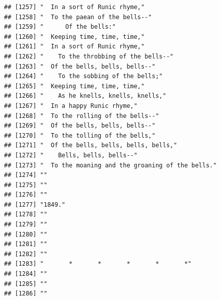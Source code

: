 \documentclass{article}\usepackage[]{graphicx}\usepackage[]{color}
\makeatletter
\newenvironment{kframe}{%
 \def\at@end@of@kframe{}%
 \ifinner\ifhmode%
  \def\at@end@of@kframe{\end{minipage}}%
  \begin{minipage}{\columnwidth}%
 \fi\fi%
 \def\FrameCommand##1{\hskip\@totalleftmargin \hskip-\fboxsep
 \colorbox{shadecolor}{##1}\hskip-\fboxsep
     \hskip-\linewidth \hskip-\@totalleftmargin \hskip\columnwidth}%
 \MakeFramed {\advance\hsize-\width
   \@totalleftmargin\z@ \linewidth\hsize
   \@setminipage}}%
 {\par\unskip\endMakeFramed%
 \at@end@of@kframe}
\newenvironment{knitrout}{}{} %
\makeatother
\begin{document}
\begin{knitrout}
\begin{kframe}
\begin{verbatim}
## [1257] "  In a sort of Runic rhyme,"                                                 
## [1258] "  To the paean of the bells--"                                               
## [1259] "      Of the bells:"                                                         
## [1260] "  Keeping time, time, time,"                                                 
## [1261] "  In a sort of Runic rhyme,"                                                 
## [1262] "    To the throbbing of the bells--"                                         
## [1263] "  Of the bells, bells, bells--"                                              
## [1264] "    To the sobbing of the bells;"                                            
## [1265] "  Keeping time, time, time,"                                                 
## [1266] "    As he knells, knells, knells,"                                           
## [1267] "  In a happy Runic rhyme,"                                                   
## [1268] "  To the rolling of the bells--"                                             
## [1269] "  Of the bells, bells, bells--"                                              
## [1270] "  To the tolling of the bells,"                                              
## [1271] "  Of the bells, bells, bells, bells,"                                        
## [1272] "    Bells, bells, bells--"                                                   
## [1273] "  To the moaning and the groaning of the bells."                             
## [1274] ""                                                                            
## [1275] ""                                                                            
## [1276] ""                                                                            
## [1277] "1849."                                                                       
## [1278] ""                                                                            
## [1279] ""                                                                            
## [1280] ""                                                                            
## [1281] ""                                                                            
## [1282] ""                                                                            
## [1283] "       *       *       *       *       *"                                    
## [1284] ""                                                                            
## [1285] ""                                                                            
## [1286] ""                                                                            

\end{verbatim}
\end{kframe}
\end{knitrout}
\end{document}
